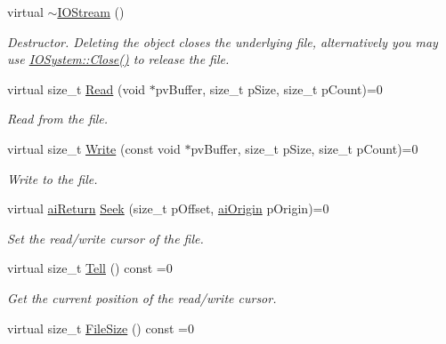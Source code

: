 \begin{DoxyCompactItemize}
\item 
\hypertarget{class_assimp_1_1_i_o_stream_a6cedc5033bf531bf14b97d1c9b788de8}{virtual \hyperlink{class_assimp_1_1_i_o_stream_a6cedc5033bf531bf14b97d1c9b788de8}{$\sim$\-I\-O\-Stream} ()}\label{class_assimp_1_1_i_o_stream_a6cedc5033bf531bf14b97d1c9b788de8}

\begin{DoxyCompactList}\small\item\em Destructor. Deleting the object closes the underlying file, alternatively you may use \hyperlink{class_assimp_1_1_i_o_system_a8c334d60f04bceeb6bd0157d21723f3e}{I\-O\-System\-::\-Close()} to release the file. \end{DoxyCompactList}\item 
virtual size\-\_\-t \hyperlink{class_assimp_1_1_i_o_stream_ae376f641020989d61863b9c6f55c7abf}{Read} (void $\ast$pv\-Buffer, size\-\_\-t p\-Size, size\-\_\-t p\-Count)=0
\begin{DoxyCompactList}\small\item\em Read from the file. \end{DoxyCompactList}\item 
virtual size\-\_\-t \hyperlink{class_assimp_1_1_i_o_stream_ad0ca4aae1b8c4d00db391ac3a4171f7b}{Write} (const void $\ast$pv\-Buffer, size\-\_\-t p\-Size, size\-\_\-t p\-Count)=0
\begin{DoxyCompactList}\small\item\em Write to the file. \end{DoxyCompactList}\item 
virtual \hyperlink{types_8h_a1f78dfb65090aa930cabb984c8abe711}{ai\-Return} \hyperlink{class_assimp_1_1_i_o_stream_a5ed0dddf418ab08cf3fc21f3f3032220}{Seek} (size\-\_\-t p\-Offset, \hyperlink{types_8h_ac50fbaa57d78776ca99e42104d9b2786}{ai\-Origin} p\-Origin)=0
\begin{DoxyCompactList}\small\item\em Set the read/write cursor of the file. \end{DoxyCompactList}\item 
virtual size\-\_\-t \hyperlink{class_assimp_1_1_i_o_stream_a316ac6cd16b5a493d1313f792c806194}{Tell} () const =0
\begin{DoxyCompactList}\small\item\em Get the current position of the read/write cursor. \end{DoxyCompactList}\item 
\hypertarget{class_assimp_1_1_i_o_stream_aaa01183d197fb714f28d6c611b6fa058}{virtual size\-\_\-t \hyperlink{class_assimp_1_1_i_o_stream_aaa01183d197fb714f28d6c611b6fa058}{File\-Size} () const =0}\label{class_assimp_1_1_i_o_stream_aaa01183d197fb714f28d6c611b6fa058}


\end{DoxyCompactItemize}
